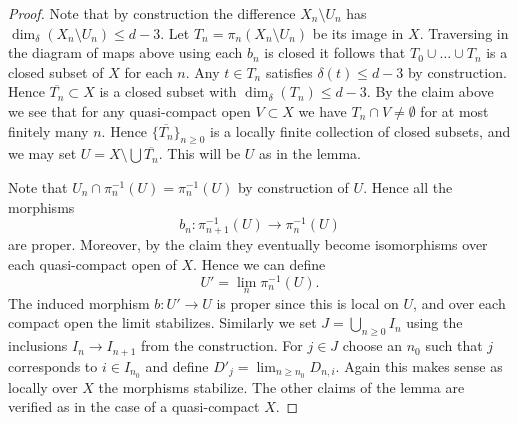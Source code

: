 \begin{proof}
\medskip\noindent
Note that by construction the difference $X_n \setminus U_n$
has $\dim_\delta(X_n \setminus U_n) \leq d - 3$.
Let $T_n = \pi_n(X_n \setminus U_n)$ be its image in $X$.
Traversing in the diagram of maps above using each $b_n$ is closed
it follows that $T_0 \cup \ldots \cup T_n$ is a closed subset of $X$
for each $n$. Any $t \in T_n$ satisfies $\delta(t) \leq d - 3$
by construction. Hence $\overline{T_n} \subset X$ is a closed subset
with $\dim_\delta(T_n) \leq d - 3$. By the claim above we see
that for any quasi-compact open $V \subset X$ we have
$T_n \cap V \not = \emptyset$ for at most finitely many $n$.
Hence $\{\overline{T_n}\}_{n \geq 0}$ is a locally finite
collection of closed subsets, and we may set
$U = X \setminus \bigcup \overline{T_n}$. This will be
$U$ as in the lemma.

\medskip\noindent
Note that $U_n \cap \pi_n^{-1}(U) = \pi_n^{-1}(U)$ by construction
of $U$. Hence all the morphisms
$$
b_n : \pi_{n + 1}^{-1}(U) \longrightarrow \pi_n^{-1}(U)
$$
are proper. Moreover, by the claim they eventually become isomorphisms
over each quasi-compact open of $X$. Hence we can define
$$
U' = \lim_n \pi_n^{-1}(U).
$$
The induced morphism $b : U' \to U$ is proper since this is local
on $U$, and over each compact open the limit stabilizes. Similarly
we set $J = \bigcup_{n \geq 0} I_n$ using the inclusions
$I_n \to I_{n + 1}$ from the construction. For $j \in J$ choose
an $n_0$ such that $j$ corresponds to $i \in I_{n_0}$ and define
$D'_j = \lim_{n \geq n_0} D_{n, i}$. Again this makes sense
as locally over $X$ the morphisms stabilize.
The other claims of the lemma are verified as in the case
of a quasi-compact $X$.
\end{proof}
